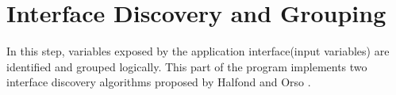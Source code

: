 \section{Interface Discovery and Grouping}

In this step, variables exposed by the application interface(input variables) are identified and grouped logically. This part of the program implements two interface discovery algorithms proposed by Halfond and Orso \cite{ref2}.


